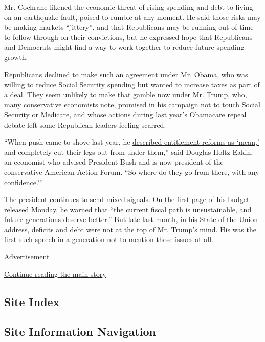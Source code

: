 Mr. Cochrane likened the economic threat of rising spending and debt to
living on an earthquake fault, poised to rumble at any moment. He said
those risks may be making markets ``jittery'', and that Republicans may
be running out of time to follow through on their convictions, but he
expressed hope that Republicans and Democrats might find a way to work
together to reduce future spending growth.

Republicans
\href{http://www.nytimes3xbfgragh.onion/2012/04/01/magazine/obama-vs-boehner-who-killed-the-debt-deal.html}{declined
to make such an agreement under Mr. Obama}, who was willing to reduce
Social Security spending but wanted to increase taxes as part of a deal.
They seem unlikely to make that gamble now under Mr. Trump, who, many
conservative economists note, promised in his campaign not to touch
Social Security or Medicare, and whose actions during last year's
Obamacare repeal debate left some Republican leaders feeling scarred.

``When push came to shove last year, he
\href{https://www.usatoday.com/story/news/politics/onpolitics/2017/06/13/trump-told-senators-obamacare-repeal-bill-he-once-celebrated-mean/102826114/}{described
entitlement reforms as `mean,'} and completely cut their legs out from
under them,'' said Douglas Holtz-Eakin, an economist who advised
President Bush and is now president of the conservative American Action
Forum. ``So where do they go from there, with any confidence?''

The president continues to send mixed signals. On the first page of his
budget released Monday, he warned that ``the current fiscal path is
unsustainable, and future generations deserve better.'' But late last
month, in his State of the Union address, deficits and debt
\href{https://www.huffingtonpost.com/entry/trump-deficits-debt-state-of-the-union_us_5a71d823e4b0be822ba25139}{were
not at the top of Mr. Trump's mind}. His was the first such speech in a
generation not to mention those issues at all.

Advertisement

\protect\hyperlink{after-bottom}{Continue reading the main story}

\hypertarget{site-index}{%
\subsection{Site Index}\label{site-index}}

\hypertarget{site-information-navigation}{%
\subsection{Site Information
Navigation}\label{site-information-navigation}}

